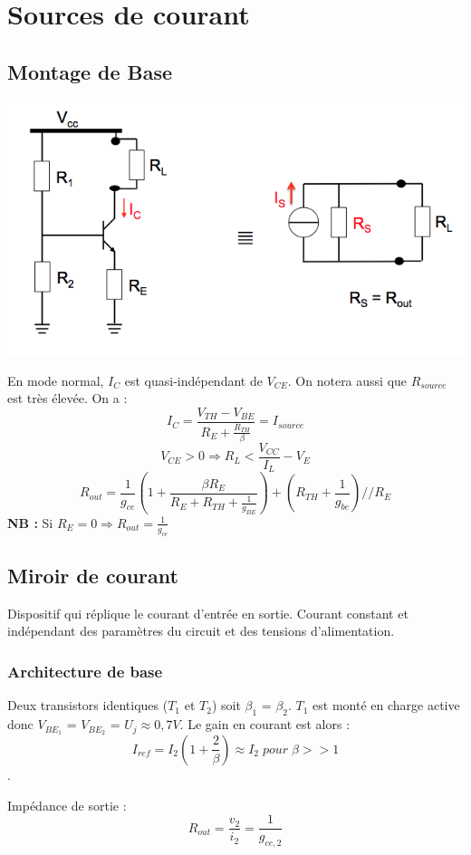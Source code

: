 \documentclass[]{article}
\begin{document}
\section{Sources de courant}
\subsection{Montage de Base}
\includegraphics[scale=0.7]{courant}

En mode normal, $I_C$ est quasi-indépendant de $V_{CE}$. On notera aussi que $R_{source}$ est très élevée.
On a : $$ I_C = \frac{V_{TH} - V_{BE}}{R_E + \frac{R_{TH}}{\beta}} = I_{source}$$
$$ V_{CE} > 0 \Rightarrow R_L < \frac{V_{CC}}{I_L} - V_E $$
$$ R_{out} = \frac{1}{g_{ce}}(1+\frac{\beta R_E}{R_E+ R_{TH}+ \frac{1}{g_{BE}}})+(R_{TH}+\frac{1}{g_{be}})//R_E$$
\textbf{NB :} Si $R_E = 0 \Rightarrow R_{out} = \frac{1}{g_{ce}}$

\subsection{Miroir de courant}
Dispositif qui réplique le courant d'entrée en sortie. Courant constant et indépendant des paramètres du circuit et des 
tensions d’alimentation.

\subsubsection{Architecture de base}
Deux transistors identiques ($T_1$ et $T_2$) soit $\beta_1$ = $\beta_2$. $T_1$ est monté en charge active donc $V_{BE_1}$ = $V_{BE_2}$ = $U_j \approx  0,7 V$. Le gain en courant est alors : $$I_{ref} = I_2 (1 + \frac{2}{\beta}) \approx  I_{2}  \; pour \; \beta >> 1$$.

Impédance de sortie : $$ R_{out} = \frac{v_2}{i_2} = \frac{1}{g_{ce,2}} $$
\end{document}
